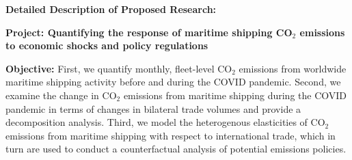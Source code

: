 \documentclass[hidelinks, 12pt,letterpaper]{article}
\begin{document}




\begin{center}
\textbf{Detailed Description of Proposed Research: }\vspace{-0.25cm}
\end{center}

\noindent \textbf{Project: Quantifying the response of maritime shipping CO$_2$ emissions to economic shocks and policy regulations}
\smallskip

\noindent \textbf{Objective:} First, we quantify monthly, fleet-level CO$_2$ emissions from worldwide maritime shipping activity before and during the COVID pandemic.
Second, we examine the change in CO$_2$ emissions from maritime shipping during the COVID pandemic in terms of changes in bilateral trade volumes and provide a decomposition analysis. 
Third, we model the heterogenous elasticities of CO$_2$ emissions from maritime shipping with respect to international trade, which in turn are used to conduct a counterfactual analysis of potential emissions policies.
\smallskip
\end{document}
